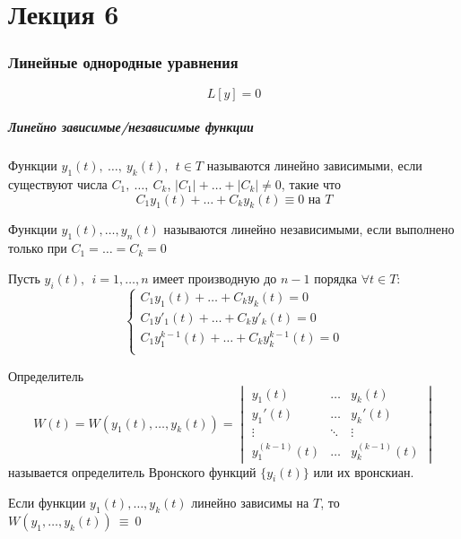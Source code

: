 \section{Лекция 6}
\subsubsection{Линейные однородные уравнения}
\begin{equation}
\label{six.three}
L[y] = 0
\end{equation}
\subparagraph{Линейно зависимые/независимые функции}
\begin{df}
Функции $y_1(t),~ \ldots,~ y_k(t),~~ t \in T$ называются линейно зависимыми, если существуют числа $C_1,~ \ldots,~ C_k$, $|C_1| + \ldots + |C_k| \neq 0$, такие что 
\begin{equation}
\label{six.four}
C_1y_1(t) + \ldots + C_ky_k(t) \equiv 0 \text{ на $T$}
\end{equation}
\end{df}
\begin{df}
Функции $y_1(t), \ldots, y_n(t)$ называются линейно независимыми, если  выполнено только при $C_1 = \ldots = C_k = 0$
\end{df}

Пусть $y_i(t),~~i = 1, \ldots, n$ имеет производную до $n - 1$ порядка $\forall t \in T$:
\[
\begin{cases}
C_1y_1(t) + \ldots + C_ky_k(t) = 0 \\
C_1y'_1(t) + \ldots + C_ky'_k(t) = 0 \\
C_1y^{k - 1}_1(t) + \ldots + C_ky^{k - 1}_k(t) = 0 \\
\end{cases}
\]
\begin{df}
Определитель
\[ W(t) = W(y_1(t), \ldots, y_k(t)) = 
\begin{vmatrix}
y_1(t) & \ldots & y_k(t) \\
y_1'(t) & \ldots & y_k'(t) \\
\vdots & \ddots & \vdots \\
y_1^{(k - 1)}(t) & \ldots & y_k^{(k - 1)}(t)
\end{vmatrix}\]
называется определитель Вронского функций $\{y_i(t)\}$ или их вронскиан.
\end{df}

\begin{lem}
Если функции $y_1(t), \ldots, y_k(t)$ линейно зависимы на $T$, то $W(y_1, \ldots, y_k(t))~\equiv~0$
\end{lem}


